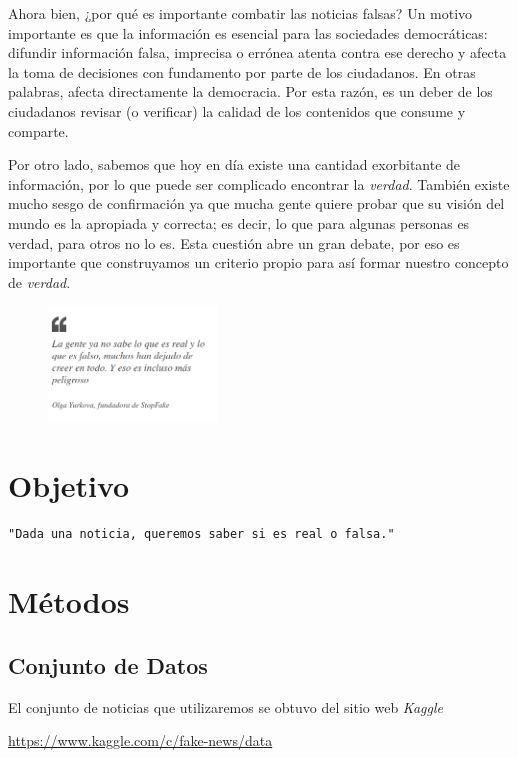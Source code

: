\documentclass[letterpaper,11pt]{article}
\begin{document}
Ahora bien, ¿por qué es importante combatir las noticias falsas? Un motivo 
importante es que la información es esencial para las sociedades democráticas:
difundir información falsa, imprecisa o errónea atenta contra ese derecho y 
afecta la toma de decisiones con fundamento por parte de los ciudadanos. En 
otras palabras, afecta directamente la democracia. Por esta razón, es un 
deber de los ciudadanos revisar (o verificar) la calidad de los contenidos que 
consume y comparte. 

Por otro lado, sabemos que hoy en día existe una cantidad exorbitante de 
información, por lo que puede ser complicado encontrar la \textit{verdad}. 
También existe mucho sesgo de confirmación ya que mucha gente quiere probar que 
su visión del mundo es la apropiada y correcta; es decir, lo que para algunas 
personas es verdad, para otros no lo es. Esta cuestión abre un gran debate, por 
eso es importante que construyamos un criterio propio para así formar nuestro 
concepto de \textit{verdad}.
\begin{figure}[ht]
    \centering
    \includegraphics[width=0.4\textwidth]{./imagenes/frase.png}
\end{figure}    

\section{Objetivo}
\begin{center}
    \texttt{"Dada una noticia, queremos saber si es real o falsa."}
\end{center}

\section{Métodos}
\subsection{Conjunto de Datos}
El conjunto de noticias que utilizaremos se obtuvo del sitio web \textit{Kaggle}
\begin{center}
    \url{https://www.kaggle.com/c/fake-news/data}
\end{center}
\end{document}
